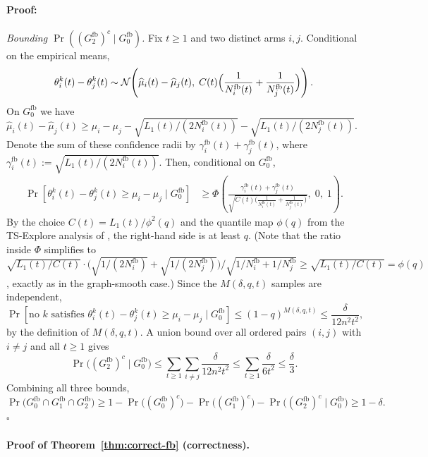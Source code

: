 \documentclass{article}
\newenvironment{proof}{\paragraph{Proof:}}{\hfill$\square$}
\begin{document}
\begin{proof}
\emph{Bounding $\Pr((G_2^{\mathrm{fb}})^c\mid G_0^{\mathrm{fb}})$.}
Fix $t\ge 1$ and two distinct arms $i,j$. Conditional on the empirical means,
\[
\theta_i^k(t)-\theta_j^k(t)
\sim
\mathcal N\!\left(
\widehat\mu_i(t)-\widehat\mu_j(t),\;
C(t)\Bigl(\frac{1}{N_i^{\mathrm{fb}}(t)}+\frac{1}{N_j^{\mathrm{fb}}(t)}\Bigr)
\right).
\]
On $G_0^{\mathrm{fb}}$ we have $\widehat\mu_i(t)-\widehat\mu_j(t)\ge \mu_i-\mu_j - \sqrt{L_1(t)/(2N_i^{\mathrm{fb}}(t))} - \sqrt{L_1(t)/(2N_j^{\mathrm{fb}}(t))}$. Denote the sum of these confidence radii by $\gamma_i^{\mathrm{fb}}(t)+\gamma_j^{\mathrm{fb}}(t)$, where $\gamma_i^{\mathrm{fb}}(t):=\sqrt{L_1(t)/(2N_i^{\mathrm{fb}}(t))}$. Then, conditional on $G_0^{\mathrm{fb}}$,
\begin{align*}
\Pr\!\left[
\theta_i^k(t)-\theta_j^k(t)\ge \mu_i-\mu_j
\mid G_0^{\mathrm{fb}}
\right]
&\ge
\Phi\!\left(
\frac{\gamma_i^{\mathrm{fb}}(t)+\gamma_j^{\mathrm{fb}}(t)}{
\sqrt{C(t)\bigl(\frac{1}{N_i^{\mathrm{fb}}(t)}+\frac{1}{N_j^{\mathrm{fb}}(t)}\bigr)}
},\;0,\;1
\right).
\end{align*}
By the choice $C(t)=L_1(t)/\phi^2(q)$ and the quantile map $\phi(q)$ from the TS-Explore analysis of \citet{wang2022thompson}, the right-hand side is at least $q$. (Note that the ratio inside $\Phi$ simplifies to $\sqrt{L_1(t)/C(t)}\cdot\bigl(\sqrt{1/(2N_i^{\mathrm{fb}})}+\sqrt{1/(2N_j^{\mathrm{fb}})}\bigr)/\sqrt{1/N_i^{\mathrm{fb}}+1/N_j^{\mathrm{fb}}}\ge \sqrt{L_1(t)/C(t)}=\phi(q)$, exactly as in the graph-smooth case.) Since the $M(\delta,q,t)$ samples are independent,
\[
\Pr\!\left[
\text{no }k\text{ satisfies }
\theta_i^k(t)-\theta_j^k(t)\ge \mu_i-\mu_j
\mid G_0^{\mathrm{fb}}
\right]
\le (1-q)^{M(\delta,q,t)}
\le \frac{\delta}{12n^2t^2},
\]
by the definition of $M(\delta,q,t)$. A union bound over all ordered pairs $(i,j)$ with $i\neq j$ and all $t\ge 1$ gives
\[
\Pr\!\bigl((G_2^{\mathrm{fb}})^c\mid G_0^{\mathrm{fb}}\bigr)
\le
\sum_{t\ge 1}\sum_{i\neq j}\frac{\delta}{12n^2t^2}
\le
\sum_{t\ge 1}\frac{\delta}{6t^2}
\le
\frac{\delta}{3}.
\]
Combining all three bounds,
\[
\Pr\!\bigl(G_0^{\mathrm{fb}}\cap G_1^{\mathrm{fb}}\cap G_2^{\mathrm{fb}}\bigr)
\ge
1-\Pr\!\bigl((G_0^{\mathrm{fb}})^c\bigr)-\Pr\!\bigl((G_1^{\mathrm{fb}})^c\bigr)-\Pr\!\bigl((G_2^{\mathrm{fb}})^c\mid G_0^{\mathrm{fb}}\bigr)
\ge 1-\delta.
\]
\end{proof}

\paragraph{Proof of Theorem~\ref{thm:correct-fb} (correctness).}
\end{document}
